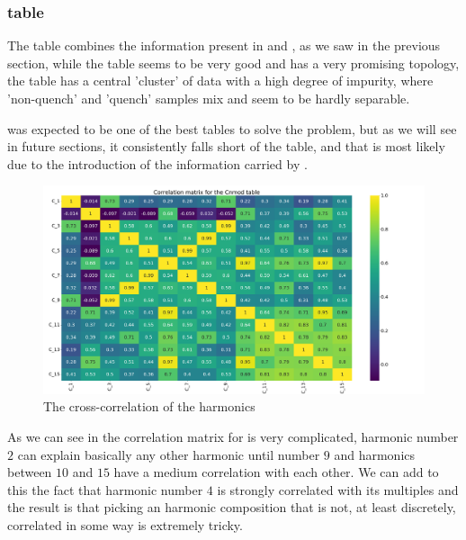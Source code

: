 \subsubsection{\cnmod table}
The \cnmod table combines the information present in \an and \bn, as we saw in the previous section,
while the \an table seems to be very good and has a very promising topology, the \bn table has a
central 'cluster' of data with a high degree of impurity, where 'non-quench' and 'quench' samples
mix and seem to be hardly separable.

\cnmod was expected to be one of the best tables to solve the problem, but as we will see in future
sections, it consistently falls short of the \an table, and that is most likely due to the
introduction of the information carried by \bn.
\begin{figure}[h!]
	\centering
	\includegraphics[width=\linewidth]{img/Cnmod_corr_matrix.png}
	\caption{The cross-correlation of the \cnmod harmonics} \label{fig:cnmod-corr}
\end{figure}

As we can see in  the correlation matrix for \cnmod is very complicated,
harmonic number $2$ can explain basically any other harmonic until number $9$ and harmonics between
$10$ and $15$ have a medium correlation with each other. We can add to this the fact that harmonic
number $4$ is strongly correlated with its multiples and the result is that picking an harmonic
composition that is not, at least discretely, correlated in some way is extremely tricky.

